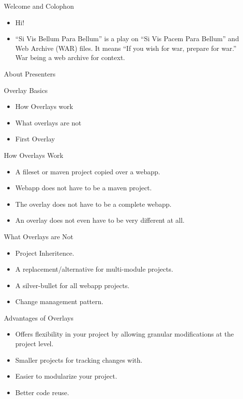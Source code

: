 \documentclass[xcolor=dvipsnames,14pt,professionalfonts]{beamer}
\begin{document}
\begin{frame}{Welcome and Colophon}
  \begin{itemize}
    \item Hi!
    \item ``Si Vis Bellum Para Bellum'' is a play on ``Si Vis Pacem
      Para Bellum'' and Web Archive (WAR) files. It means ``If you
      wish for war, prepare for war.'' War being a web archive for context.
  \end{itemize}
\end{frame}

\begin{frame}{About Presenters}
\end{frame}

\begin{frame}{Overlay Basics}
  \begin{itemize}
  \item How Overlays work
  \item What overlays are not
  \item First Overlay
  \end{itemize}
\end{frame}

\begin{frame}{How Overlays Work}
  \begin{itemize}
    \item A fileset or maven project copied over a webapp.
    \item Webapp does not have to be a maven project.
    \item The overlay does not have to be a complete webapp.
    \item An overlay does not even have to be very different at all.
  \end{itemize}
\end{frame}

\begin{frame}{What Overlays are Not}
  \begin{itemize}
  \item Project Inheritence.
  \item A replacement/alternative for multi-module projects.
  \item A silver-bullet for all webapp projects.
  \item Change management pattern.
  \end{itemize}
\end{frame}


\begin{frame}{Advantages of Overlays}
  \begin{itemize}
    \item Offers flexibility in your project by allowing granular
      modifications at the project level.
    \item Smaller projects for tracking changes with.
    \item Easier to modularize your project.
    \item Better code reuse.
  \end{itemize}
\end{frame}
\end{document}
